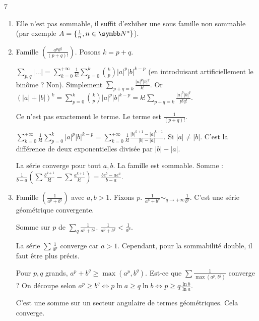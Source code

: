 \begin{correction}{7}
\begin{enumerate}
    \item Elle n'est pas sommable, il suffit d'exhiber une sous famille non sommable (par exemple $A = \{\frac 1 n, n \in \N^*\}$).
    
    \item 
        Famille $\left(\frac{a^p b^q}{(p+q)!}\right)$.
        Posons $k=p+q$.
        
        $\sum_{p,q} | \dots | = \sum_{k=0}^{+ \infty} \frac{1}{k!} \sum_{p=0}^k \binom{k}{p} |a|^p |b|^{k-p}$ 
        (en introduisant artificiellement le binôme ? Non).
        Simplement $\sum_{p+q=k} \frac{|a|^p |b|^q}{k!}$.
        Or $(|a|+|b|)^k = \sum_{p=0}^k \binom{k}{p} |a|^p |b|^{k-p} = k! \sum_{p+q=k} \frac{|a|^p |b|^q}{p! q!}$.

        Ce n'est pas exactement le terme.
        Le terme est $\frac{1}{(p+q)!}$.

        $\sum_{k=0}^{+ \infty} \frac{1}{k!} \sum_{p=0}^k |a|^p |b|^{k-p} = \sum_{k=0}^{+ \infty} \frac{1}{k!} \frac{|b|^{k+1}-|a|^{k+1}}{|b|-|a|}$.
        Si $|a| \neq |b|$. C'est la différence de deux exponentielles divisée par $|b|-|a|$.

        La série converge pour tout $a,b$. La famille est sommable.
        Somme : $\frac{1}{b-a} \left(\sum \frac{b^{k+1}}{k!} - \sum \frac{a^{k+1}}{k!}\right) = \frac{b e^b - a e^a}{b-a}$.

    \item 
        Famille $\left(\frac{1}{a^p+b^q}\right)$ avec $a,b > 1$.
        Fixons $p$. $\frac{1}{a^p+b^q} \sim_{q \to + \infty} \frac{1}{b^q}$. C'est une série géométrique convergente.

        Somme sur $p$ de $\sum_q \frac{1}{a^p+b^q}$.
        $\frac{1}{a^p+b^q} < \frac{1}{a^p}$.

        La série $\sum \frac{1}{a^p}$ converge car $a>1$.
        Cependant, pour la sommabilité double, il faut être plus précis.

        Pour $p,q$ grands, $a^p+b^q \ge \max(a^p, b^q)$.
        Est-ce que $\sum \frac{1}{\max(a^p, b^q)}$ converge ?
        On découpe selon $a^p \ge b^q \iff p \ln a \ge q \ln b \iff p \ge q \frac{\ln b}{\ln a}$.

        C'est une somme sur un secteur angulaire de termes géométriques. Cela converge.
\end{enumerate}
\end{correction}

